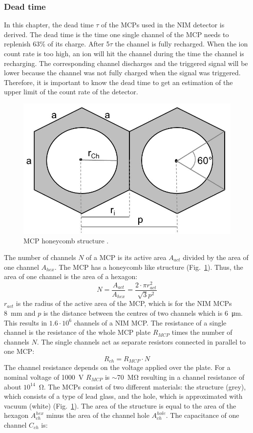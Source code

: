 	
	\subsubsection{Dead time}
	In this chapter, the dead time $\tau$ of the MCPs used in the NIM detector is derived. The dead time is the time one single channel of the MCP needs to replenish 63\% of its charge. After 5$\tau$ the channel is fully recharged. When the ion count rate is too high, an ion will hit the channel during the time the channel is recharging. The corresponding channel discharges and the triggered signal will be lower because the channel was not fully charged when the signal was triggered. Therefore, it is important to know the dead time to get an estimation of the upper limit of the count rate of the detector.\\
	\begin{figure}[H]
		\centering
		\includegraphics[width=.4\textwidth]{Bilder/MCP_hex.jpg}
		\caption{MCP honeycomb structure \cite{Diss_Neuland}.}
		\label{fig:MCPhex}
	\end{figure}
	The number of channels $N$ of a MCP is its active area $A_{act}$ divided by the area of one channel $A_{hex}$. The MCP has a honeycomb like structure (Fig.~\ref{fig:MCPhex}). Thus, the area of one channel is the area of a hexagon:
	\begin{equation}
		N = \frac{A_{act}}{A_{hex}} = \frac{2\cdot\pi r^2_{act}}{\sqrt{3}p^2}
	\end{equation}
	$r_{act}$ is the radius of the active area of the MCP, which is for the NIM MCPs 8~mm and $p$ is the distance between the centres of two channels which is 6~\si{\micro\meter}. This results in $1.6\cdot10^6$ channels of a NIM MCP. The resistance of a single channel is the resistance of the whole MCP plate $R_{MCP}$ times the number of channels $N$. The single channels act as separate resistors connected in parallel to one MCP:
	\begin{equation}
		R_{ch} = R_{MCP}\cdot N
	\end{equation}
	The channel resistance depends on the voltage applied over the plate. For a nominal voltage of 1000~\si{\volt} $R_{MCP}$ is $\sim$70~\si{\mega\ohm} resulting in a channel resistance of about $10^{14}$~\si{\ohm}. The MCPs consist of two different materials: the structure (grey), which consists of a type of lead glass, and the hole, which is approximated with vacuum (white) (Fig.~\ref{fig:MCPhex}). The area of the structure is equal to the area of the hexagon $A^{hex}_{ch}$ minus the area of the channel hole $A^{hole}_{ch}$. The capacitance of one channel $C_{ch}$ is:
